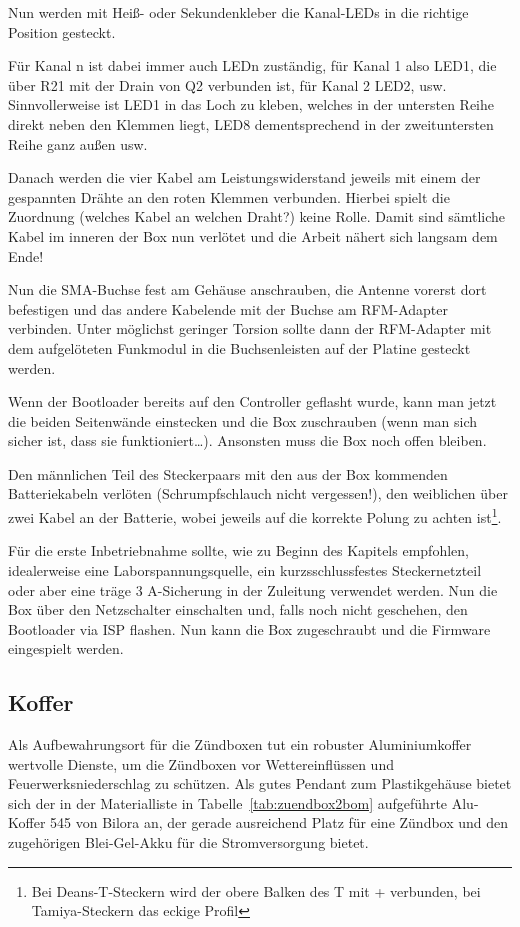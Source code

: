 \documentclass[paper=a4, parskip, numbers=noenddot, toc=listof, headsepline]{scrbook}
\begin{document}
				Nun werden mit Heiß- oder Sekundenkleber die Kanal-LEDs in die richtige Position gesteckt.

				Für Kanal n ist dabei immer auch LEDn zuständig, für Kanal 1 also LED1, die über R21 mit der Drain von Q2 verbunden ist, für Kanal 2 LED2, usw. Sinnvollerweise ist LED1 in das Loch zu kleben, welches in der untersten Reihe direkt neben den Klemmen liegt, LED8 dementsprechend in der zweituntersten Reihe ganz außen usw.

				Danach werden die vier Kabel am Leistungswiderstand jeweils mit einem der gespannten Drähte an den roten Klemmen verbunden. Hierbei spielt die Zuordnung (welches Kabel an welchen Draht?) keine Rolle. Damit sind sämtliche Kabel im inneren der Box nun verlötet und die Arbeit nähert sich langsam dem Ende!

				Nun die SMA-Buchse fest am Gehäuse anschrauben, die Antenne vorerst dort befestigen und das andere Kabelende mit der Buchse am RFM-Adapter verbinden. Unter möglichst geringer Torsion sollte dann der RFM-Adapter mit dem aufgelöteten Funkmodul in die Buchsenleisten auf der Platine gesteckt werden.

				Wenn der Bootloader bereits auf den Controller geflasht wurde, kann man jetzt die beiden Seitenwände einstecken und die Box zuschrauben (wenn man sich sicher ist, dass sie funktioniert\dots). Ansonsten muss die Box noch offen bleiben.

				Den männlichen Teil des Steckerpaars mit den aus der Box kommenden Batteriekabeln verlöten (Schrumpfschlauch nicht vergessen!), den weiblichen über zwei Kabel an der Batterie, wobei jeweils auf die korrekte Polung zu achten ist\footnote{Bei Deans-T-Steckern wird der obere Balken des T mit + verbunden, bei Tamiya-Steckern das eckige Profil}.

				Für die erste Inbetriebnahme sollte, wie zu Beginn des Kapitels empfohlen, idealerweise eine Laborspannungsquelle, ein kurzsschlussfestes Steckernetzteil oder aber eine träge 3 A-Sicherung in der Zuleitung verwendet werden. Nun die Box über den Netzschalter einschalten und, falls noch nicht geschehen, den Bootloader via ISP flashen. Nun kann die Box zugeschraubt und die
				Firmware eingespielt werden.

			\subsection{Koffer}

				Als Aufbewahrungsort für die Zündboxen tut ein robuster Aluminiumkoffer wertvolle Dienste, um die Zündboxen vor Wettereinflüssen und Feuerwerks\-nieder\-schlag zu schützen. Als gutes Pendant zum Plastikgehäuse bietet sich der in der Materialliste in Tabelle~\ref{tab:zuendbox2bom} aufgeführte Alu-Koffer 545 von Bilora an, der gerade ausreichend Platz für eine Zündbox und den zugehörigen Blei-Gel-Akku für die Stromversorgung bietet.
\end{document}
